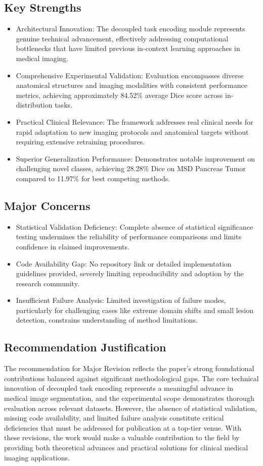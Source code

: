 \subsection{Key Strengths}
\begin{itemize}
    \item Architectural Innovation: The decoupled task encoding module represents genuine technical advancement, effectively addressing computational bottlenecks that have limited previous in-context learning approaches in medical imaging.
    \item Comprehensive Experimental Validation: Evaluation encompasses diverse anatomical structures and imaging modalities with consistent performance metrics, achieving approximately 84.52\% average Dice score across in-distribution tasks.
    \item Practical Clinical Relevance: The framework addresses real clinical needs for rapid adaptation to new imaging protocols and anatomical targets without requiring extensive retraining procedures.
    \item Superior Generalization Performance: Demonstrates notable improvement on challenging novel classes, achieving 28.28\% Dice on MSD Pancreas Tumor compared to 11.97\% for best competing methods.
\end{itemize}

\subsection{Major Concerns}
\begin{itemize}
    \item Statistical Validation Deficiency: Complete absence of statistical significance testing undermines the reliability of performance comparisons and limits confidence in claimed improvements.
    \item Code Availability Gap: No repository link or detailed implementation guidelines provided, severely limiting reproducibility and adoption by the research community.
    \item Insufficient Failure Analysis: Limited investigation of failure modes, particularly for challenging cases like extreme domain shifts and small lesion detection, constrains understanding of method limitations.
\end{itemize}

\subsection{Recommendation Justification}
The recommendation for Major Revision reflects the paper's strong foundational contributions balanced against significant methodological gaps. The core technical innovation of decoupled task encoding represents a meaningful advance in medical image segmentation, and the experimental scope demonstrates thorough evaluation across relevant datasets. However, the absence of statistical validation, missing code availability, and limited failure analysis constitute critical deficiencies that must be addressed for publication at a top-tier venue. With these revisions, the work would make a valuable contribution to the field by providing both theoretical advances and practical solutions for clinical medical imaging applications.
